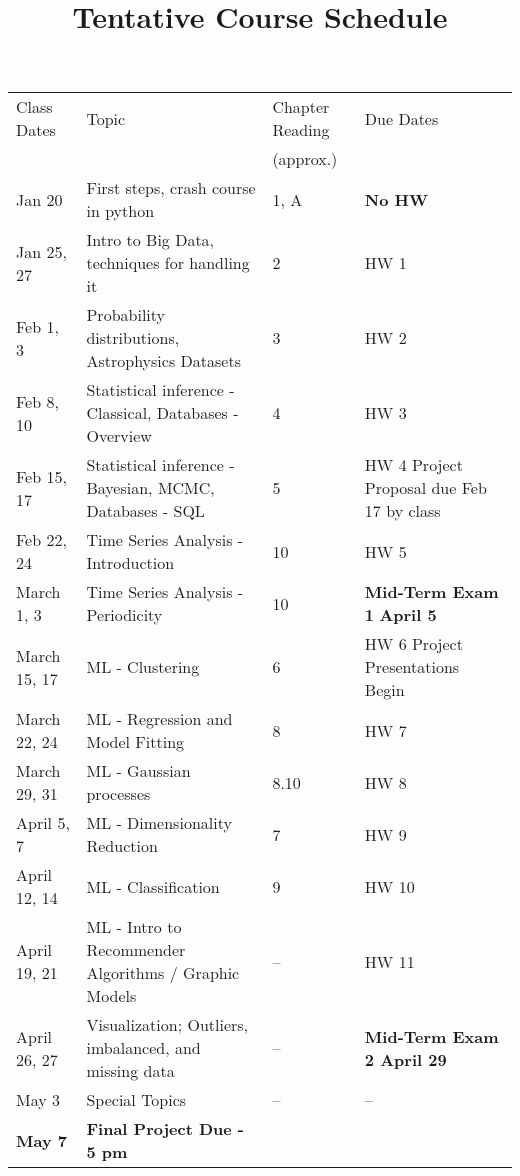 \documentclass[12pt]{article}
\begin{document}
\begin{table}[h]
\small
\title{\bf \Large Tentative Course Schedule}
\centering
\begin{tabular}{|p{25mm}|p{70mm}|p{15mm}|p{35mm}|}
\hline
Class Dates & Topic & Chapter Reading  & Due Dates \\
 &  & (approx.)  & \\
\hline
Jan 20 & First steps, crash course in python & 1, A & {\bf No HW} \\
\hline
Jan 25, 27 & Intro to Big Data, techniques for handling it & 2 & HW 1 \\
 \hline
Feb 1, 3 & Probability distributions, Astrophysics Datasets   &  3  & HW 2 \\
 \hline
Feb 8, 10 & Statistical inference - Classical, Databases - Overview  &  4  & HW 3  \\
\hline
Feb 15, 17 & Statistical inference -Bayesian,  MCMC, Databases - SQL   &  5  & HW 4 \newline Project Proposal due Feb 17 by class  \\
 \hline
Feb 22, 24 & Time Series Analysis - Introduction & 10  & HW 5 \\
 \hline
March 1, 3 & Time Series Analysis - Periodicity & 10  & {\bf Mid-Term Exam 1} {\bf April 5}  \\
 \hline
March 15, 17 & ML - Clustering & 6 & HW 6 \newline Project Presentations Begin \\
 \hline
March 22, 24 & ML - Regression and Model Fitting & 8 & HW 7  \\ 
 \hline
 March 29, 31 & ML - Gaussian processes  & 8.10 & HW 8 \\ 
 \hline
 April 5, 7 & ML - Dimensionality Reduction & 7 & HW 9 \\
 \hline 
April 12, 14 & ML - Classification & 9 & HW 10 \\
 \hline
April 19, 21 & ML - Intro to Recommender Algorithms / Graphic Models  & -- & HW 11 \\
 \hline
 April 26, 27 & Visualization; Outliers, imbalanced, and missing data  & -- & \bf Mid-Term Exam 2 {\bf April 29} \\
 \hline
May 3 & Special Topics & -- & -- \\
 \hline
{\bf May 7} & {\bf Final Project Due - 5 pm} & & ~\\ 
\hline
\end{tabular}
\label{tab:chisq}
\end{table}
\clearpage
\end{document}
